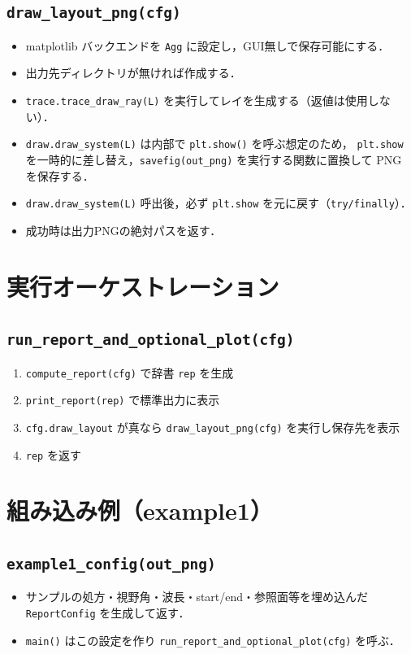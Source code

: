 \documentclass[a4paper,11pt]{jsarticle} %
\begin{document}
\subsection{\texttt{draw\_layout\_png(cfg)}}
\begin{itemize}
  \item matplotlib バックエンドを \texttt{Agg} に設定し，GUI無しで保存可能にする．
  \item 出力先ディレクトリが無ければ作成する．
  \item \texttt{trace.trace\_draw\_ray(L)} を実行してレイを生成する（返値は使用しない）．
  \item \texttt{draw.draw\_system(L)} は内部で \texttt{plt.show()} を呼ぶ想定のため，
        \texttt{plt.show} を一時的に差し替え，\texttt{savefig(out\_png)} を実行する関数に置換して PNG を保存する．
  \item \texttt{draw.draw\_system(L)} 呼出後，必ず \texttt{plt.show} を元に戻す（\texttt{try/finally}）．
  \item 成功時は出力PNGの絶対パスを返す．
\end{itemize}

\section{実行オーケストレーション}
\subsection{\texttt{run\_report\_and\_optional\_plot(cfg)}}
\begin{enumerate}
  \item \texttt{compute\_report(cfg)} で辞書 \texttt{rep} を生成
  \item \texttt{print\_report(rep)} で標準出力に表示
  \item \texttt{cfg.draw\_layout} が真なら \texttt{draw\_layout\_png(cfg)} を実行し保存先を表示
  \item \texttt{rep} を返す
\end{enumerate}

\section{組み込み例（example1）}
\subsection{\texttt{example1\_config(out\_png)}}
\begin{itemize}
  \item サンプルの処方・視野角・波長・start/end・参照面等を埋め込んだ \texttt{ReportConfig} を生成して返す．
  \item \texttt{main()} はこの設定を作り \texttt{run\_report\_and\_optional\_plot(cfg)} を呼ぶ．
\end{itemize}
\end{document}
